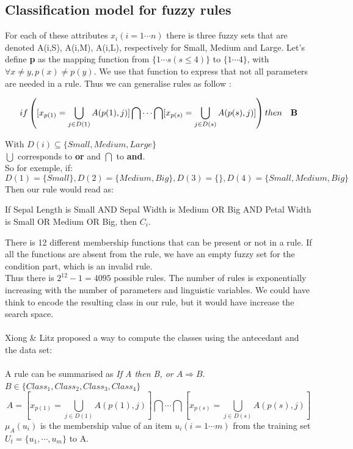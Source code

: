 \documentclass[a4paper,12pt]{article}
\begin{document}
\subsection{Classification model for fuzzy rules}
For each of these attributes $x_{i}(i=1\cdots n)$ there is three fuzzy sets that are denoted A(i,S), A(i,M), A(i,L), respectively for Small, Medium and Large.
Let's define \textbf{p} as the mapping function from $\{1\cdots s(s\leq4)\}$ to $\{1\cdots4\}$, with $\forall x\neq y, p(x)\neq p(y)$. We use that function to express that not all parameters are needed in a rule.
Thus we can generalise rules as follow :

\[if \left( [x_{p(1)}=\bigcup_{j\in D(1)}A(p(1),j) ] \bigcap\cdots\bigcap[x_{p(s)}=\bigcup_{j\in D(s)}A(p(s),j) ] \right) then\quad \bf B \] 

With $D(i)\subseteq\{Small,Medium,Large\}$ \\
$\bigcup$ corresponds to \textbf{or} and $\bigcap$ to \textbf{and}.\\
So for exemple, if:
\[D(1)=\{Small\},D(2)=\{Medium,Big\},D(3)=\{\},D(4)=\{Small,Medium,Big\}\]
Then our rule would read as:
\begin{center}If Sepal Length is Small AND Sepal Width is Medium OR Big AND Petal Width is Small OR Medium OR Big, then $C_i$.\end{center} 
There is 12 different membership functions that can be present or not in a rule. If all the functions are absent from the rule, we have an empty fuzzy set for the condition part, which is an invalid rule.\\
Thus there is $2^{12}-1=4095$ possible rules. The number of rules is exponentially increasing with the number of parameters and linguistic variables. We could have think to encode the resulting class in our rule, but it would have increase the search space. \\ 
\\
Xiong \& Litz proposed a way to compute the classes using the antecedant and the data set: \\
\\
A rule can be summarised as \textit{If A then B, or $A\Rightarrow B$}.\\
$B\in \{Class_1,Class_2,Class_3,Class_4\}$\\
\[A=[x_{p(1)}=\bigcup_{j\in D(1)}A(p(1),j) ] \bigcap\cdots\bigcap[x_{p(s)}=\bigcup_{j\in D(s)}A(p(s),j)]\]
$\mu_A(u_i)$ is the membership value of an item $u_i(i=1\cdots m)$ from the training set $U_t=\{u_1,\cdots ,u_m\}$ to A.
\end{document}
